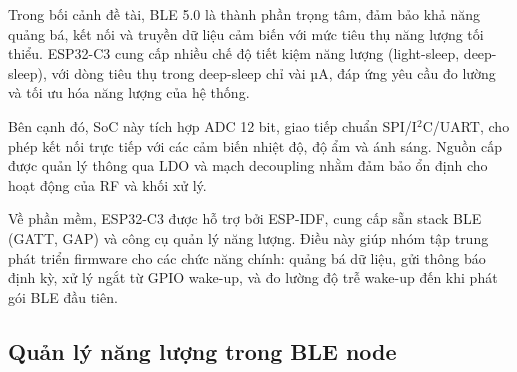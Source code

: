 Trong bối cảnh đề tài, BLE 5.0 là thành phần trọng tâm, đảm bảo khả năng quảng bá, kết nối và truyền dữ liệu cảm biến với mức tiêu thụ năng lượng tối thiểu. ESP32-C3 cung cấp nhiều chế độ tiết kiệm năng lượng (light-sleep, deep-sleep), với dòng tiêu thụ trong deep-sleep chỉ vài µA, đáp ứng yêu cầu đo lường và tối ưu hóa năng lượng của hệ thống.

Bên cạnh đó, SoC này tích hợp ADC 12 bit, giao tiếp chuẩn SPI/I$^{2}$C/UART, cho phép kết nối trực tiếp với các cảm biến nhiệt độ, độ ẩm và ánh sáng. Nguồn cấp được quản lý thông qua LDO và mạch decoupling nhằm đảm bảo ổn định cho hoạt động của RF và khối xử lý.

Về phần mềm, ESP32-C3 được hỗ trợ bởi ESP-IDF, cung cấp sẵn stack BLE (GATT, GAP) và công cụ quản lý năng lượng. Điều này giúp nhóm tập trung phát triển firmware cho các chức năng chính: quảng bá dữ liệu, gửi thông báo định kỳ, xử lý ngắt từ GPIO wake-up, và đo lường độ trễ wake-up đến khi phát gói BLE đầu tiên.

\subsection{Quản lý năng lượng trong BLE node}

%
%

